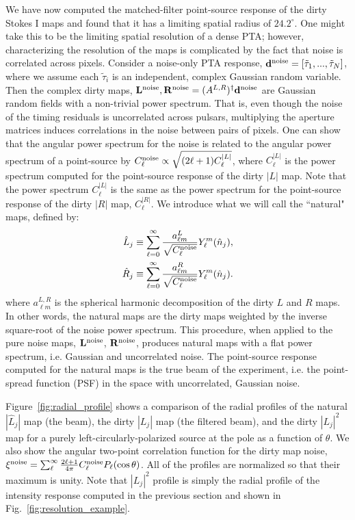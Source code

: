 \documentclass[%
 reprint,
nofootinbib,
 amsmath,amssymb,
 aps,
]{revtex4-2}
\begin{document}
We have now computed the matched-filter point-source response of the dirty Stokes I maps and found that it has a limiting spatial radius of $24.2^\circ$. One might take this to be the limiting spatial resolution of a dense PTA; however, characterizing the resolution of the maps is complicated by the fact that noise is correlated across pixels. Consider a noise-only PTA response, $\mathbf{d}^{\rm noise} = [\tilde{\tau}_1, ...,\tilde{\tau}_N]$, where we assume each $\tilde{\tau}_i$ is an independent, complex Gaussian random variable. Then the complex dirty maps, $\mathbf{L}^{\rm noise}, \mathbf{R}^{\rm noise} = (A^{L, R})^\dagger \mathbf{d}^{\rm noise}$ are Gaussian random fields with a non-trivial power spectrum. That is, even though the noise of the timing residuals is uncorrelated across pulsars, multiplying the aperture matrices induces correlations in the noise between pairs of pixels. One can show that the angular power spectrum for the noise is related to the angular power spectrum of a point-source by $C^{\rm noise}_\ell \propto \sqrt{(2 \ell + 1) C_\ell^{|L|}}$, where $C^{|L|}_\ell$ is the power spectrum computed for the point-source response of the dirty $|L|$ map. Note that the power spectrum $C^{|L|}_\ell$ is the same as the power spectrum for the point-source response of the dirty $|R|$ map, $C^{|R|}_\ell$. We introduce what we will call the ``natural" maps, defined by:
\begin{align}
    \hat{L}_j &\equiv \sum_{\ell = 0}^\infty \frac{a^L_{\ell m}}{\sqrt{C^{\rm noise}_\ell}} Y^m_\ell (\hat{n}_j) , \\
    \hat{R}_j &\equiv \sum_{\ell = 0}^\infty \frac{a^R_{\ell m}}{\sqrt{C^{\rm noise}_\ell}} Y^m_\ell (\hat{n}_j).
    \label{eq:natmap}
\end{align}
where $a^{L, R}_{\ell m}$ is the spherical harmonic decomposition of the dirty $L$ and $R$ maps. In other words, the natural maps are the dirty maps weighted by the inverse square-root of the noise power spectrum. This procedure, when applied to the pure noise maps, $\mathbf{L}^{\rm noise}$, $\mathbf{R}^{\rm noise}$, produces natural maps with a flat power spectrum, i.e. Gaussian and uncorrelated noise. The point-source response computed for the natural maps is the true beam of the experiment, i.e. the point-spread function (PSF) in the space with uncorrelated, Gaussian noise. 

Figure~\ref{fig:radial_profile} shows a comparison of the radial profiles of the natural $|\hat{L}_j|$ map (the beam), the dirty $|L_j|$ map (the filtered beam), and the dirty $|L_j|^2$ map for a purely left-circularly-polarized source at the pole as a function of $\theta$. We also show the angular two-point correlation function for the dirty map noise, $\xi^{\rm noise} = \sum_\ell^\infty \frac{2 \ell + 1}{4 \pi} C^{\rm noise}_\ell P_\ell (\cos\theta)$. All of the profiles are normalized so that their maximum is unity. Note that $|L_j|^2$ profile is simply the radial profile of the intensity response computed in the previous section and shown in Fig.~\ref{fig:resolution_example}.
\end{document}
